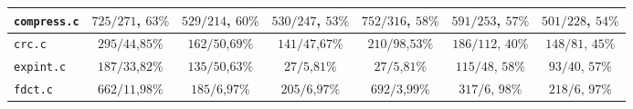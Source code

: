 \begin{tabular}{ |l| |c|c|c|c| |c|c| }
  \\\hline
  \verb|compress.c|
  & \hspace{.5em}$ 725/271$, $63\%$ & $529/214$, $60\%$ & \hspace{.5em}$ 530/247$, $53\%$ & \hspace{.5em}$ 752/316$, $58\%$
& \hspace{.5em}$591/253$,                 $57\%$ & \hspace{.5em}$501/228$,                 $54\%$

  \\\hline
  \verb|crc.c|
  & \hspace{.5em}$  295/44$,\hspace{.5em}$85\%$ & $ 162/50$,\hspace{.5em}$69\%$ & \hspace{.5em}$  141/47$,\hspace{.5em}$67\%$ & \hspace{.5em}$  210/98$,\hspace{.5em}$53\%$
& \hspace{.5em}$186/112$,                 $40\%$ & \hspace{.5em}$148/81$,    \hspace{.5em}$45\%$

  \\\hline
  \verb|expint.c|
  & \hspace{.5em}$  187/33$,\hspace{.5em}$82\%$ & $ 135/50$,\hspace{.5em}$63\%$ & \hspace{1em}$    27/5$,\hspace{1em}$81\%$ & \hspace{1em}$    27/5$,\hspace{1em}$81\%$
& \hspace{.5em}$115/48$,    \hspace{.5em}$58\%$ & \hspace{1em}$93/40$,     \hspace{.5em}$57\%$

  \\\hline
  \verb|fdct.c|
  & \hspace{.5em}$  662/11$,\hspace{.5em}$98\%$ & $  185/6$,\hspace{1em}$97\%$ & \hspace{.5em}$   205/6$,\hspace{1em}$97\%$ & \hspace{.5em}$   692/3$,\hspace{1em}$99\%$
& \hspace{.5em}$317/6$,     \hspace{1em}$98\%$ & \hspace{.5em}$218/6$,     \hspace{1em}$97\%$


\end{tabular}
